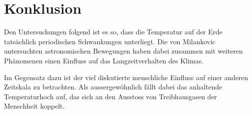 %
%
%
%
\section{Konklusion
\label{milankovic:section:Konklusion}}

Den Untersuchungen folgend ist es so, dass die Temperatur auf der Erde tatsächlich periodischen Schwankungen unterliegt.
Die von Milankovic untersuchten astronomischen Bewegungen haben dabei zusammen mit weiteren Phänomenen einen Einfluss auf das Langzeitverhalten des Klimas.

Im Gegensatz dazu ist der viel diskutierte menschliche Einfluss auf einer anderen Zeitskala zu betrachten.
Als aussergewöhnlich fällt dabei das anhaltende Temperaturhoch auf, das sich an den Ausstoss von Treibhausgasen der Menschheit koppelt. 

